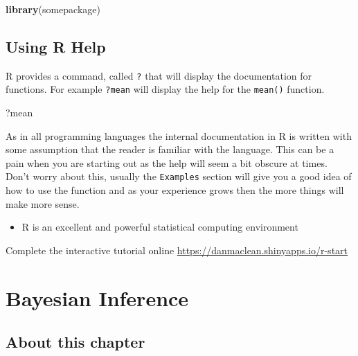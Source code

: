 \documentclass[
]{book}
\newenvironment{Shaded}{\begin{snugshade}}{\end{snugshade}}
\newcommand{\KeywordTok}[1]{\textcolor[rgb]{0.13,0.29,0.53}{\textbf{#1}}}
\newcommand{\NormalTok}[1]{#1}
\providecommand{\tightlist}{%
  \setlength{\itemsep}{0pt}\setlength{\parskip}{0pt}}
\newenvironment{task}
{ \begin{tcolorbox}[title=For you to do,title filled] }
{  \end{tcolorbox} }
\newenvironment{roundup}
{ \begin{tcolorbox}[colbacktitle=yellow!50!white,
title=Round Up,coltitle=black,
fonttitle=\bfseries] }
{  \end{tcolorbox} }
\begin{document}
\begin{Shaded}
\begin{Highlighting}[]
\KeywordTok{library}\NormalTok{(somepackage)}
\end{Highlighting}
\end{Shaded}

\hypertarget{using-r-help}{%
\section{Using R Help}\label{using-r-help}}

R provides a command, called \texttt{?} that will display the documentation for functions. For example \texttt{?mean} will display the help for the \texttt{mean()} function.

\begin{Shaded}
\begin{Highlighting}[]
\NormalTok{?mean}
\end{Highlighting}
\end{Shaded}

As in all programming languages the internal documentation in R is written with some assumption that the reader is familiar with the language. This can be a pain when you are starting out as the help will seem a bit obscure at times. Don't worry about this, usually the \texttt{Examples} section will give you a good idea of how to use the function and as your experience grows then the more things will make more sense.

\begin{roundup}
\begin{itemize}
\tightlist
\item
  R is an excellent and powerful statistical computing environment
\end{itemize}
\end{roundup}

\begin{task}
Complete the interactive tutorial online \url{https://danmaclean.shinyapps.io/r-start}
\end{task}

\hypertarget{bayesian-inference}{%
\chapter{Bayesian Inference}\label{bayesian-inference}}

\hypertarget{about-this-chapter-1}{%
\section{About this chapter}\label{about-this-chapter-1}}
\end{document}
